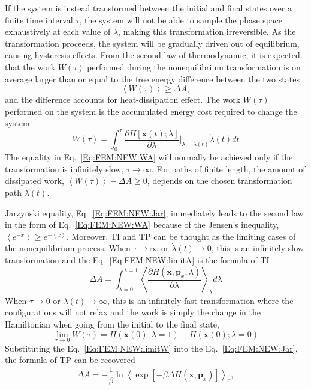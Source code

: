 If the system is instead transformed between the initial and final states over a finite time interval $\tau$, the system will not be able to sample the phase space exhaustively at each value of $\lambda$, making this transformation irreversible. As the transformation proceeds, the system will be gradually driven out of equilibrium, causing hysteresis effects. From the second law of thermodynamic, it is expected that the work $W(\tau)$ performed during the nonequilibrium transformation is on average larger than or equal to the free energy difference between the two states
\begin{equation}
\left \langle W(\tau) \right \rangle \ge \Delta A,
\label{Eq:FEM:NEW:WA}
\end{equation} 
and the difference accounts for heat-dissipation effect. The work $W(\tau)$ performed on the system is the accumulated energy cost required to change the system
\begin{equation}
W(\tau) = \int_{0}^{\tau} \frac{\partial{H[\textbf{x}(t);\lambda]}}{\partial{\lambda}}\bigg\rvert_{\lambda=\lambda(t)} \dot{\lambda}(t) dt
\label{Eq:FEM:NEW:work}
\end{equation}    
The equality in Eq.~\ref{Eq:FEM:NEW:WA} will normally be achieved only if the transformation is infinitely slow, $\tau\to\infty$.  For paths of finite length, the amount of dissipated work, $\left \langle W(\tau) \right \rangle - \Delta A \ge 0$, depends on the chosen transformation path $\lambda(t)$.

Jarzynski equality, Eq.~\ref{Eq:FEM:NEW:Jar}, immediately leads to the second law in the form of Eq.~\ref{Eq:FEM:NEW:WA} because of the Jensen's inequality, $\left \langle e^{-x} \right \rangle \ge e^{-\left<x\right>} $.
Moreover, TI and TP can be thought as the limiting cases of the nonequilibrium process. When $\tau\to\infty$ or $\dot{\lambda}(t)\to0$, this is an infinitely slow transformation and the Eq.~\ref{Eq:FEM:NEW:limitA} is the formula of TI
\begin{equation}
\Delta A = \int_{\lambda=0}^{\lambda=1}\left \langle \frac{\partial{H(\textbf{x},\textbf{p}_{x},\lambda)}}{\partial{\lambda}} \right \rangle_{\lambda} d\lambda
\label{Eq:FEM:NEW:TINEW}
\end{equation}  
When $\tau\to0$ or $\dot{\lambda}(t)\to\infty$, this is an infinitely fast transformation where the configurations will not relax and the work is simply the change in the Hamiltonian when going from the initial to the final state,
\begin{equation}
\lim_{\tau\to0}W(\tau) = H(\textbf{x}(0);\lambda=1)-H(\textbf{x}(0);\lambda=0)
\label{Eq:FEM:NEW:limitW}
\end{equation}
Substituting the Eq.~\ref{Eq:FEM:NEW:limitW} into the Eq.~\ref{Eq:FEM:NEW:Jar}, the formula of TP can be recovered
\begin{equation}
\Delta A = -\frac{1}{\beta} \ln \left \langle \exp[-\beta \Delta H(\textbf{x},\textbf{p}_{x})] \right \rangle  _{0},
\label{Eq:FEM:NEW:deltaA4NEW}
\end{equation}

